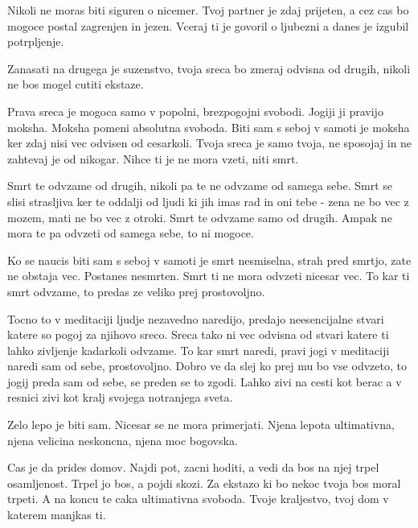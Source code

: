 Nikoli ne moras biti siguren o nicemer. Tvoj partner je zdaj prijeten, a cez cas bo mogoce postal zagrenjen in jezen. Vceraj ti je govoril o ljubezni a danes je izgubil potrpljenje. 

Zanasati na drugega je suzenstvo, tvoja sreca bo zmeraj odvisna od drugih, nikoli ne bos mogel cutiti ekstaze. 

Prava sreca je mogoca samo v popolni, brezpogojni svobodi. Jogiji ji pravijo moksha. Moksha pomeni absolutna svoboda. Biti sam s seboj v samoti je moksha ker zdaj nisi vec odvisen od cesarkoli. Tvoja sreca je samo tvoja, ne sposojaj in ne zahtevaj je od nikogar. Nihce ti je ne mora vzeti, niti smrt. 

Smrt te odvzame od drugih, nikoli pa te ne odvzame od samega sebe. Smrt se slisi strasljiva ker te oddalji od ljudi ki jih imas rad in oni tebe - zena ne bo vec z mozem, mati ne bo vec z otroki. Smrt te odvzame samo od drugih. Ampak ne mora te pa odvzeti od samega sebe, to ni mogoce. 

Ko se naucis biti sam s seboj v samoti je smrt nesmiselna, strah pred smrtjo, zate ne obstaja vec. Postanes nesmrten. Smrt ti ne mora odvzeti nicesar vec. To kar ti smrt odvzame, to predas ze veliko prej prostovoljno. 

Tocno to v meditaciji ljudje nezavedno naredijo, predajo neesencijalne stvari katere so pogoj za njihovo sreco. Sreca tako ni vec odvisna od stvari katere ti lahko zivljenje kadarkoli odvzame. To kar smrt naredi, pravi jogi v meditaciji naredi sam od sebe, prostovoljno. Dobro ve da slej ko prej mu bo vse odvzeto, to jogij preda sam od sebe, se preden se to zgodi. Lahko zivi na cesti kot berac a v resnici zivi kot kralj svojega notranjega sveta. 

Zelo lepo je biti sam. Nicesar se ne mora primerjati. Njena lepota ultimativna, njena velicina neskoncna, njena moc bogovska. 

Cas je da prides domov. Najdi pot, zacni hoditi, a vedi da bos na njej trpel osamljenost. Trpel jo bos, a pojdi skozi. Za ekstazo ki bo nekoc tvoja bos moral trpeti. A na koncu te caka ultimativna svoboda. Tvoje kraljestvo, tvoj dom v katerem manjkas ti. 